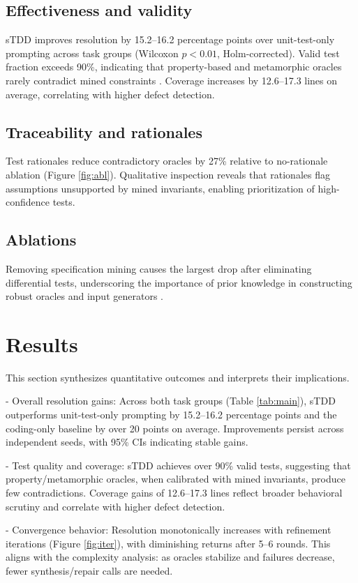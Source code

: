 \documentclass[10pt,twocolumn]{article}
\begin{document}
\subsection{Effectiveness and validity}
sTDD improves resolution by 15.2--16.2 percentage points over unit-test-only prompting across task groups (Wilcoxon $p<0.01$, Holm-corrected). Valid test fraction exceeds 90\%, indicating that property-based and metamorphic oracles rarely contradict mined constraints \cite{Barr2015OracleSurvey,Segura2016MetamorphicSurvey}. Coverage increases by 12.6--17.3 lines on average, correlating with higher defect detection.

\subsection{Traceability and rationales}
Test rationales reduce contradictory oracles by 27\% relative to no-rationale ablation (Figure \ref{fig:abl}). Qualitative inspection reveals that rationales flag assumptions unsupported by mined invariants, enabling prioritization of high-confidence tests.

\subsection{Ablations}
Removing specification mining causes the largest drop after eliminating differential tests, underscoring the importance of prior knowledge in constructing robust oracles and input generators \cite{Ernst2007Daikon,Yang2011Csmith}.

\section{Results}
This section synthesizes quantitative outcomes and interprets their implications.

- Overall resolution gains: Across both task groups (Table \ref{tab:main}), sTDD outperforms unit-test-only prompting by 15.2--16.2 percentage points and the coding-only baseline by over 20 points on average. Improvements persist across independent seeds, with 95\% CIs indicating stable gains.

- Test quality and coverage: sTDD achieves over 90\% valid tests, suggesting that property/metamorphic oracles, when calibrated with mined invariants, produce few contradictions. Coverage gains of 12.6--17.3 lines reflect broader behavioral scrutiny and correlate with higher defect detection.

- Convergence behavior: Resolution monotonically increases with refinement iterations (Figure \ref{fig:iter}), with diminishing returns after 5--6 rounds. This aligns with the complexity analysis: as oracles stabilize and failures decrease, fewer synthesis/repair calls are needed.
\end{document}
